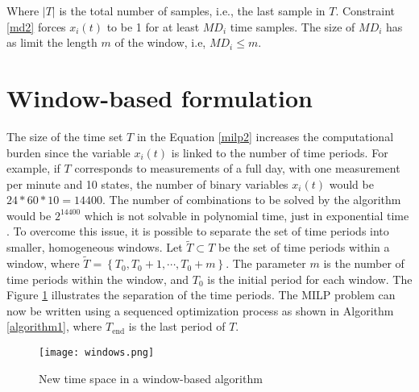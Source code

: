 Where $|T|$ is the total number of samples, i.e., the last sample in $T$. Constraint \eqref{md2} forces $x_i(t)$ to be 1 for at least $MD_i$ time samples. The size of $MD_i$ has as limit the length $m$ of the window, i.e, $MD_i \leq m$. 

\section{Window-based formulation}
The size of the time set $T$ in the Equation \eqref{milp2} increases the computational burden since the variable $x_i(t)$ is linked to the number of time periods. For example, if $T$  corresponds to measurements of a full day, with one measurement per minute and 10 states, the number of binary variables $x_i(t)$ would be $24*60*10 = 14400$. The number of combinations to be solved by the algorithm would be $2^{14400}$ which is not solvable in polynomial time, just in exponential time \cite{cocc}. To overcome this issue, it is possible to separate the set of time periods into smaller, homogeneous windows. Let $\tilde{T} \subset T$ be the set of time periods within a window, where $\tilde{T} = \left\{ T_{0} , T_{0} + 1, \cdots , T_{0} + m \right\}$. The parameter $m$ is the number of time periods within the window, and $T_{0}$ is the initial period for each window. The Figure \ref{ex_wind} illustrates the separation of the time periods. The MILP problem can now be written using a sequenced  optimization process as shown in Algorithm \ref{algorithm1}, where $T_{\text{end}}$ is the last period of $T$.


\begin{figure}[htb]
    \centering
    \texttt{[image: windows.png]}
    \caption{New time space in a window-based algorithm}
    \label{ex_wind}
\end{figure}


